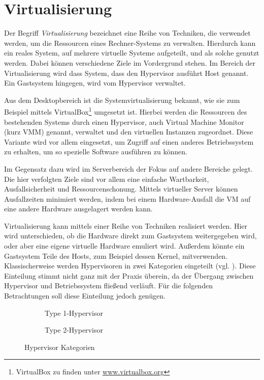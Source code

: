 \documentclass[
  a4paper,					    %
  twoside,
  DIV=calc,     				%
  bibliography=totoc,
  cleardoublepage=empty,
  ngerman,     					%
  final       					%
]{scrbook}
\begin{document}
\section{Virtualisierung}
\label{sec:Virtualisierung}
Der Begriff \emph{Virtualisierung} bezeichnet eine Reihe von Techniken, die verwendet werden, um die Ressourcen eines Rechner-Systems zu verwalten. Hierdurch kann ein reales System, auf mehrere virtuelle Systeme aufgeteilt, und als solche genutzt werden. Dabei können verschiedene Ziele im Vordergrund stehen. Im Bereich der Virtualisierung wird dass System, dass den Hypervisor ausführt Host genannt. Ein Gastsystem hingegen, wird vom Hypervisor verwaltet.

Aus dem Desktopbereich ist die Systemvirtualisierung bekannt, wie sie zum Beispiel mittels VirtualBox\footnote{VirtualBox zu finden unter \url{www.virtualbox.org}} umgesetzt ist. Hierbei werden die Ressourcen des bestehenden Systems durch einen Hypervisor, auch Virtual Machine Monitor (kurz VMM) genannt, verwaltet und den virtuellen Instanzen zugeordnet. Diese Variante wird vor allem eingesetzt, um Zugriff auf einen anderes Betriebssystem zu erhalten, um so spezielle Software ausführen zu können.

Im Gegensatz dazu wird im Serverbereich der Fokus auf andere Bereiche gelegt. Die hier verfolgten Ziele sind vor allem eine einfache Wartbarkeit, Ausfallsicherheit und Ressourcenschonung. Mittels virtueller Server können Ausfallzeiten minimiert werden, indem bei einem Hardware-Ausfall die VM auf eine andere Hardware ausgelagert werden kann.

Virtualisierung kann mittels einer Reihe von Techniken realisiert werden. Hier wird unterschieden, ob die Hardware direkt zum Gastsystem weitergegeben wird, oder aber eine eigene virtuelle Hardware emuliert wird. Außerdem könnte ein Gastsystem Teile des Hosts, zum Beispiel dessen Kernel, mitverwenden. Klassischerweise werden Hypervisoren in zwei Kategorien eingeteilt (vgl. \cite[Seite 22 ff.]{hypervisor}). Diese Einteilung stimmt nicht ganz mit der Praxis überein, da der Übergang zwischen Hypervisor und Betriebssystem fließend verläuft. Für die folgenden Betrachtungen soll diese Einteilung jedoch genügen.

\begin{figure}
    \centering
    \begin{subfigure}[b]{0.49\textwidth}
        \centering
        
        \caption{Type 1-Hypervisor}
        \label{fig:hypervisor_type1}
    \end{subfigure}
    \begin{subfigure}[b]{0.49\textwidth}
        \centering
        
        \caption{Type 2-Hypervisor}
        \label{fig:hypervisor_type2}
    \end{subfigure}
    \caption{Hypervisor Kategorien}
    \label{fig:hypervisor}
\end{figure}
\end{document}
